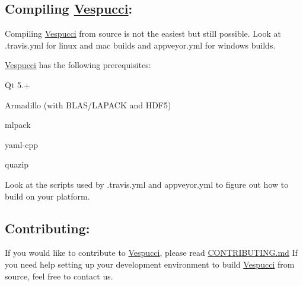 \subsection*{Compiling \hyperlink{namespace_vespucci}{Vespucci}\+: }

Compiling \hyperlink{namespace_vespucci}{Vespucci} from source is not the easiest but still possible. Look at .travis.\+yml for linux and mac builds and appveyor.\+yml for windows builds.

\hyperlink{namespace_vespucci}{Vespucci} has the following prerequisites\+:
\begin{DoxyItemize}
\item Qt 5.+
\item Armadillo (with B\+L\+A\+S/\+L\+A\+P\+A\+CK and H\+D\+F5)
\item mlpack
\item yaml-\/cpp
\item quazip
\end{DoxyItemize}

Look at the scripts used by .travis.\+yml and appveyor.\+yml to figure out how to build on your platform.

\subsection*{Contributing\+: }

If you would like to contribute to \hyperlink{namespace_vespucci}{Vespucci}, please read \hyperlink{_c_o_n_t_r_i_b_u_t_i_n_g_8md_source}{C\+O\+N\+T\+R\+I\+B\+U\+T\+I\+N\+G.\+md} If you need help setting up your development environment to build \hyperlink{namespace_vespucci}{Vespucci} from source, feel free to contact us. 